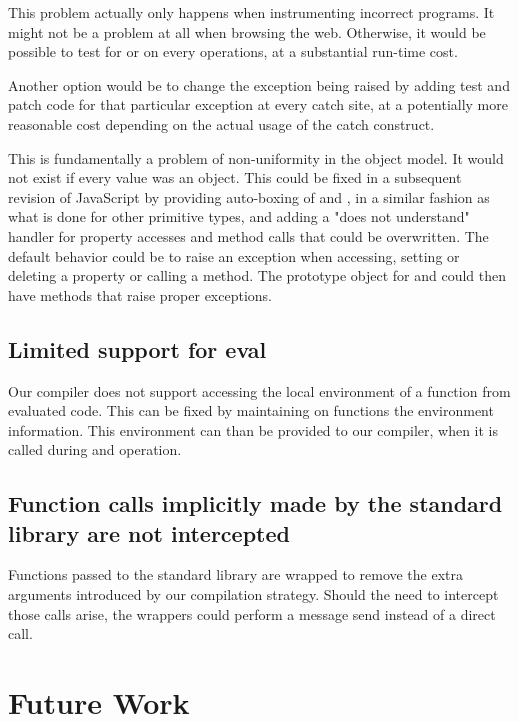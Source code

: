 This problem actually only happens when instrumenting incorrect programs. It
might not be a problem at all when browsing the web. Otherwise, it would be
possible to test for  or  on every operations, at a
substantial run-time cost.

Another option would be to change the exception being raised by adding test and
patch code for that particular exception at every catch site, at a
potentially more reasonable cost depending on the actual usage of the catch
construct.

This is fundamentally a problem of non-uniformity in the object model. It would
not exist if every value was an object.  This could be fixed in a subsequent
revision of JavaScript by providing auto-boxing of  and
, in a similar fashion as what is done for other primitive types,
and adding a "does not understand" handler for property accesses and method
calls that could be overwritten. The default behavior could be to raise an
exception when accessing, setting or deleting a property or calling a method.
The prototype object for  and  could then have methods that
raise proper exceptions.

\subsection{Limited support for eval}

Our compiler does not support accessing the local environment of a function
from evaluated code. This can be fixed by maintaining on functions the
environment information. This environment can than be provided to our compiler,
when it is called during and  operation.

\subsection{Function calls implicitly made by the standard library are not intercepted}

Functions passed to the standard library are wrapped to remove the extra
arguments introduced by our compilation strategy. Should the need to intercept
those calls arise, the wrappers could perform a message send instead of a
direct call.
 
\section{Future Work}

